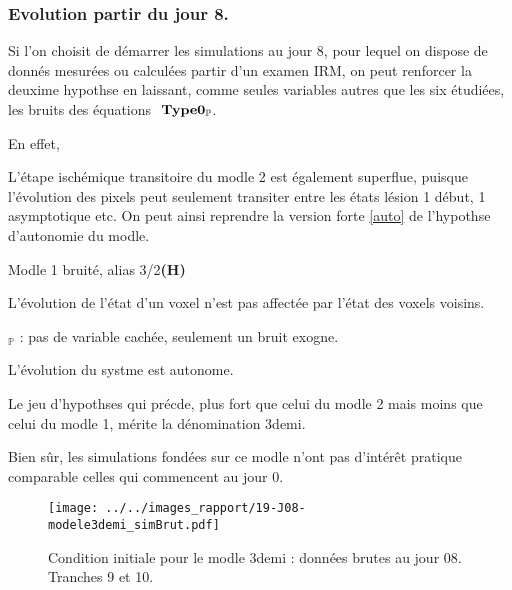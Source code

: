 \subsubsection{Evolution  partir du jour 8.}

Si l'on choisit de d\'emarrer les simulations au jour 8, pour lequel on dispose de donn\'es mesur\'ees ou calcul\'ees  partir d'un examen IRM, %
on peut renforcer la deuxime hypothse en laissant, comme seules variables autres que les six \'etudi\'ees, les bruits des \'equations $\ \mathbf{Type 0_{\mathbb{P}}}$.

\par
En effet, 

\par
L'\'etape isch\'emique transitoire du modle 2 est \'egalement superflue, %
puisque l'\'evolution des pixels peut seulement transiter entre les \'etats l\'esion 1 d\'ebut, 1 asymptotique etc. %
On peut ainsi reprendre la version forte \ref{auto} de l'hypothse d'autonomie du modle.

\begin{modmerate}{Modle 1 bruit\'e, alias \og{} 3/2\fg{}}{\textbf{(H\arabic*)}}
\item L'\'evolution de l'\'etat d'un voxel n'est pas affect\'ee par l'\'etat des voxels voisins.
\item ${}_\mathbb{P}$ : pas de variable cach\'ee, seulement un bruit exogne.
\item L'\'evolution du systme est autonome.
\end{modmerate}

Le jeu d'hypothses qui pr\'ecde, plus fort que celui du modle 2 mais moins que celui du modle 1, m\'erite la d\'enomination \og{} 3demi\fg{}.

\etoile
Bien s\^ur, les simulations fond\'ees sur ce modle n'ont pas d'int\'er\^et pratique comparable  celles qui commencent au jour 0. %


\begin{figure}[!p]
\begin{center}
\texttt{[image: ../../images\_rapport/19-J08-modele3demi\_simBrut.pdf]}
\end{center}
\caption{Condition initiale pour le modle 3demi : donn\'ees brutes au jour 08. Tranches 9 et 10.}
\label{sim_ini_18}
\end{figure}









